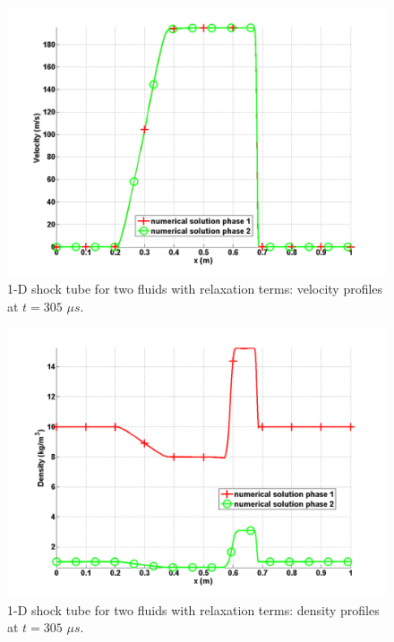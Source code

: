 %
\begin{figure}[H]
\centering
\includegraphics[width=\textwidth]{figures/SEM/relaxation_two_phases_velocity.png}
\caption{1-D shock tube for two fluids with relaxation terms: velocity profiles at $t=305$ $\mu s$.}
\label{fig:two-fluids-rel-vel-7-eqn-sect4}
\end{figure}
%
\begin{figure}[H]
\centering
\includegraphics[width=\textwidth]{figures/SEM/relaxation_two_phases_density.png}
\caption{1-D shock tube for two fluids with relaxation terms: density profiles at $t=305$ $\mu s$.}
\label{fig:two-fluids-rel-rho-7-eqn-sect4}
\end{figure}
%
